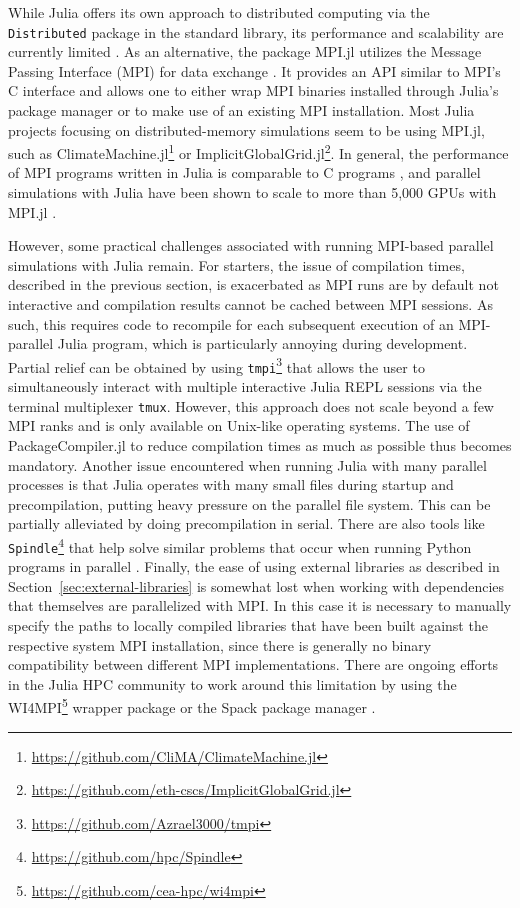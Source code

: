 \documentclass[hidelinks]{juliacon} %
\begin{document}
While Julia offers its own approach to distributed computing via the \lstinline{Distributed} package
in the standard library, its performance and scalability are currently limited \cite{byrne2021mpi}.
As an alternative, the package MPI.jl utilizes the Message Passing Interface (MPI) for data
exchange \cite{byrne2021mpi}. It provides an API similar to MPI's C interface and allows one to either
wrap MPI binaries installed through Julia's package manager or to make use of an existing MPI
installation.  Most Julia projects focusing on distributed-memory simulations seem to be using
MPI.jl, such as ClimateMachine.jl\footnote{\url{https://github.com/CliMA/ClimateMachine.jl}} or
ImplicitGlobalGrid.jl\footnote{\url{https://github.com/eth-cscs/ImplicitGlobalGrid.jl}}.  In
general, the performance of MPI programs written in Julia is comparable to C programs
\cite{hunold2020benchmarking}, and parallel simulations with Julia have been shown to scale
to more than 5{,}000 GPUs with MPI.jl \cite{omlin2020solving}.

However, some practical challenges associated with running MPI-based parallel
simulations with Julia remain. For starters, the issue of compilation times, described in the previous
section, is exacerbated as MPI runs are by default not interactive and compilation results cannot be cached between MPI sessions. As such, this
requires code to recompile for each subsequent execution of an MPI-parallel Julia program,
which is particularly annoying during development. Partial relief can be obtained by using
\texttt{tmpi}\footnote{\url{https://github.com/Azrael3000/tmpi}} that allows the user to simultaneously
interact with multiple interactive Julia REPL sessions via the terminal multiplexer \texttt{tmux}.
However, this approach does not scale beyond a few MPI ranks and is only available on
Unix-like operating systems. The use of PackageCompiler.jl to reduce compilation times as much as
possible thus becomes mandatory. Another issue encountered when running Julia with many parallel
processes is that Julia operates with many small files during startup and precompilation,
putting heavy pressure on the parallel file system. This can be partially alleviated by doing
precompilation in serial. There are also tools like
\texttt{Spindle}\footnote{\url{https://github.com/hpc/Spindle}} that help solve similar
problems that occur when running Python programs in parallel \cite{frings2013parallelloading}.
Finally, the ease of using external libraries as described in Section~\ref{sec:external-libraries} is
somewhat lost when working with dependencies that themselves are parallelized with MPI. In this
case it is necessary to manually specify the paths to locally compiled libraries that have been
built against the respective system MPI installation, since there is generally no binary
compatibility between different MPI implementations. There are ongoing efforts in the Julia HPC
community to work around this limitation by using the
WI4MPI\footnote{\url{https://github.com/cea-hpc/wi4mpi}} wrapper package or the
Spack package manager \cite{gamblin2015spack,byrne2021mpi}.
\end{document}
